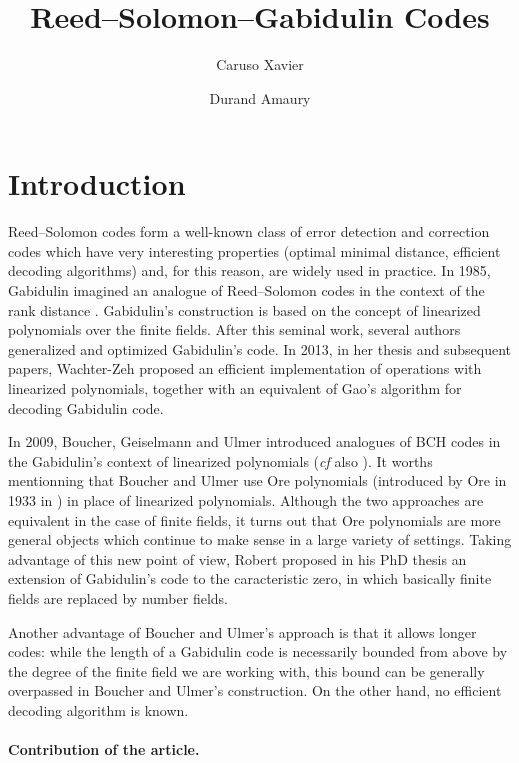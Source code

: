 \documentclass[a4paper]{llncs}
\author{Caruso Xavier \and Durand Amaury}
\institute{CNRS, Institut Mathématique de Bordeaux\\
Rennes ? Versailles ? Besançon ?}
\title{Reed--Solomon--Gabidulin Codes}
\begin{document}
\maketitle

\section*{Introduction}


Reed--Solomon codes form a well-known class of error detection and 
correction codes which have very interesting properties (optimal minimal 
distance, efficient decoding algorithms) and, for this reason, are 
widely used in practice. In 1985, Gabidulin \cite{gabidulin} imagined an 
analogue of Reed--Solomon codes in the context of the rank distance . 
Gabidulin's construction is based on the concept of linearized 
polynomials over the finite fields. After this seminal work, several 
authors generalized and optimized Gabidulin's code. In 2013, in her 
thesis \cite{wachter} and subsequent papers, Wachter-Zeh proposed an 
efficient implementation of operations with linearized polynomials, 
together with an equivalent of Gao's algorithm for decoding Gabidulin 
code. 

In 2009, Boucher, Geiselmann and Ulmer \cite{bougeiulm} introduced 
analogues of BCH codes in the Gabidulin's context of linearized 
polynomials (\emph{cf} also \cite{bouulm}). 
It worths mentionning that Boucher and Ulmer use Ore 
polynomials (introduced by Ore in 1933 in \cite{ore}) in place of 
linearized polynomials. Although the two approaches are equivalent in 
the case of finite fields, it turns out that Ore polynomials are more 
general objects which continue to make sense in a large variety of 
settings.
Taking advantage of this new point of view, Robert proposed in his
PhD thesis \cite{robert} an extension of Gabidulin's code to the
caracteristic zero, in which basically finite fields are replaced 
by number fields.

Another advantage of Boucher and Ulmer's approach is that it allows 
longer codes: while the length of a Gabidulin code is necessarily 
bounded from above by the degree of the finite field we are working 
with, this bound can be generally overpassed in Boucher and Ulmer's 
construction. On the other hand, no efficient decoding algorithm is 
known.

\paragraph{Contribution of the article.}
\end{document}
